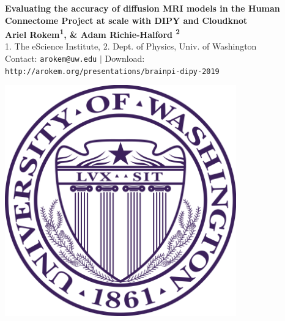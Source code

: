 \documentclass[a0, landscape]{a0poster}
\begin{document}


\begin{minipage}[b]{0.85\linewidth}
\veryHuge \color{NavyBlue} \textbf{Evaluating the accuracy of diffusion MRI models in the Human Connectome Project at scale with DIPY and Cloudknot} \color{Black}\\ %
\huge \textbf{Ariel Rokem\textsuperscript{1}, \& Adam Richie-Halford \textsuperscript{2}}\\ %
\Large 1. The eScience Institute, 2. Dept. of Physics, Univ. of Washington \\ %
\Large Contact: \texttt{arokem@uw.edu} $|$ Download: \texttt{http://arokem.org/presentations/brainpi-dipy-2019}
\end{minipage}
%
%
\begin{minipage}[b]{0.19\linewidth}
\includegraphics[width=10cm]{UWlogo.png}
\end{minipage}
\end{document}
